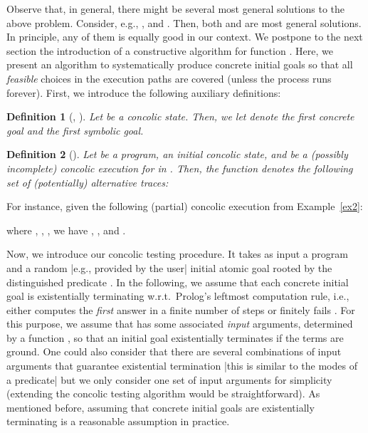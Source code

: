 \documentclass[fleqn]{tlp}
\newtheorem{definition}{Definition} \newtheorem{example}{Example} \newtheorem{lemma}{Lemma} \newtheorem{proposition}{Proposition} \newtheorem{theorem}{Theorem} \newtheorem{corollary}{Corollary}
\begin{document}
Observe that, in general, there might be several most general solutions to
the above problem. Consider, e.g., ,
 and . Then, both 
and  are most general solutions.  In principle, any of them is
equally good in our context.
We postpone to the next section the introduction of a constructive
algorithm for function .  Here, we present an algorithm to
systematically produce concrete initial goals so that all
\emph{feasible} choices in the execution paths are covered (unless the
process runs forever).
First, we introduce the following auxiliary definitions:

\begin{definition}[, ]
\label{defn:conc:symb}
  Let  be a concolic
  state. Then, we let  denote the
  first concrete goal and  the
  first symbolic goal.
\end{definition}

\begin{definition}[] \label{def:alttrace}
  Let  be a program,  an initial concolic state, and  be a (possibly incomplete)
  concolic execution for  in .  Then, the function
   denotes the following set of (potentially) alternative
  traces:
  
\end{definition}
For instance, given the following (partial) concolic execution 
from Example~\ref{ex2}:

where , ,
, we have ,
, and
.

Now, we introduce our concolic testing procedure. It takes as input a
program and a random |e.g., provided by the user| initial atomic goal
rooted by the distinguished predicate . In the following, we assume
that each concrete initial goal  is existentially
terminating w.r.t.\ Prolog's leftmost computation rule, i.e., either
computes the \emph{first} answer in a finite number of steps or
finitely fails \cite{Vasak86a}.
For this purpose, we assume that  has some associated
\emph{input} arguments, determined by a function , so that an
initial goal  existentially terminates if the terms
 are ground. One could also consider that there
are several combinations of input arguments that guarantee existential
termination |this is similar to the modes of a predicate| but we only
consider one set of input arguments for simplicity (extending the
concolic testing algorithm would be straightforward).
As mentioned before, assuming that concrete initial goals are
existentially terminating is a reasonable assumption in practice.
\end{document}
